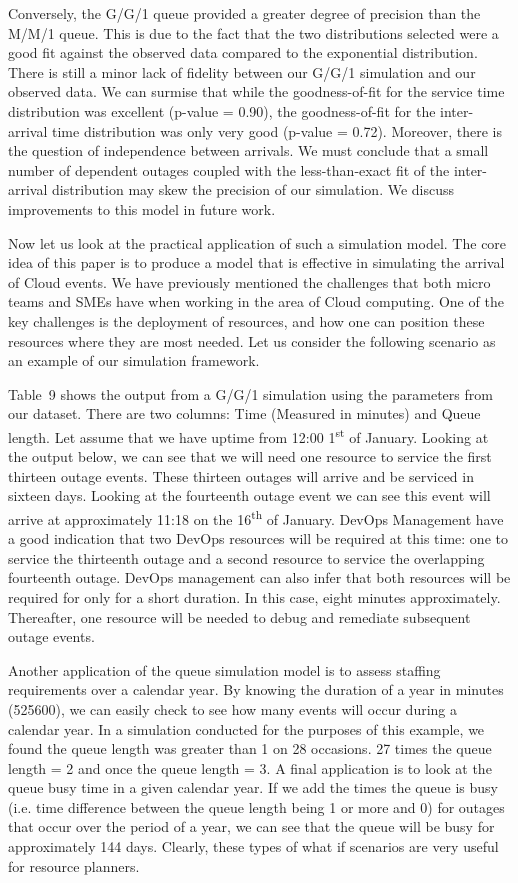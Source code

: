 \documentclass[5p]{elsarticle}
\begin{document}
Conversely, the G/G/1 queue provided a greater degree of precision than the M/M/1 queue. This is due to the fact that the two distributions selected were a good fit against the observed data compared to the exponential distribution. There is still a minor lack of fidelity between our G/G/1 simulation and our observed data. We can surmise that while the goodness-of-fit for the service time distribution 
was excellent (p-value = 0.90), the goodness-of-fit for the inter-arrival time distribution was only very good (p-value = 0.72). Moreover, there is the question of independence between arrivals. We must conclude that a small number of dependent outages coupled with the less-than-exact fit of the inter-arrival distribution may skew the precision of our simulation. We discuss improvements to this model in future work.

Now let us look at the practical application of such a simulation model. The core idea of this paper is to produce a model that is effective in simulating the arrival of Cloud events. We have previously mentioned the challenges that both micro teams and SMEs have when working in the area of Cloud computing. One of the key challenges is the deployment of resources, and how one can position these resources where they are most needed. Let us consider the following scenario as an example of our simulation framework. 

Table~9 shows the output from a G/G/1 simulation using the parameters from our dataset. There are two columns: Time (Measured in minutes) and Queue length. Let assume that  we have uptime from 12:00 1\textsuperscript{st} of January. Looking at the output below, we can see that we will need one resource to service the first  thirteen outage events. These thirteen outages will arrive and be serviced in sixteen days. Looking at the fourteenth outage event we can see this event will arrive at approximately 11:18 on the 16\textsuperscript{th} of January. DevOps Management have a good indication that two DevOps resources will be required at this time:  one to service the thirteenth outage and a second resource to service the overlapping fourteenth outage. DevOps management can also infer that both resources will be required for only for a short duration. In this case, eight minutes approximately. Thereafter, one resource will be needed to debug and remediate subsequent outage events.

Another application of the queue simulation model is to assess staffing requirements over a calendar year. By knowing the duration of a year in minutes (525600), we can easily check to see how many events will occur during a calendar year. In a simulation conducted for the purposes of this example, we found the queue length was greater than 1 on 28 occasions. 27 times the queue length = 2 and once the queue length = 3. A final application is to look at the queue busy time in a given calendar year. If we add the times the queue is busy (i.e. time difference between the queue length being 1 or more and 0) for outages that occur over the period of a year, we can see that the queue will be busy for approximately 144 days. Clearly, these types of what if scenarios are very useful for resource planners.
\end{document}
